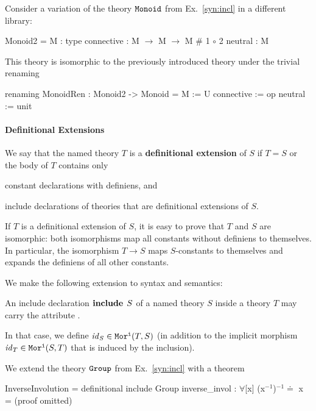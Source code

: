 \begin{example}[Renaming]
Consider a variation of the theory $\operatorname{\mathtt{Monoid}}$ from Ex.~\ref{syn:incl} in a different library:
\begin{mmtcode}
Monoid2 =
  M          : type
  connective : M $\to$ M $\to$ M	 # 1 $\circ$ 2 
  neutral    : M
\end{mmtcode}
This theory is isomorphic to the previously introduced theory  under the trivial renaming
	\begin{mmtcode}
renaming MonoidRen : Monoid2 -> Monoid =
  M          := U
  connective := op 
  neutral    := unit
\end{mmtcode}
\end{example}

\paragraph{Definitional Extensions}
We say that the named theory $T$ is a \textbf{definitional extension} of $S$ if $T=S$ or the body of $T$ contains only
\begin{compactitem}
 \item constant declarations with definiens, and
 \item include declarations of theories that are definitional extensions of $S$.
\end{compactitem}

If $T$ is a definitional extension of $S$, it is easy to prove that $T$ and $S$ are isomorphic: both isomorphisms map all constants without definiens to themselves. In particular, the isomorphism $T\to S$ maps $S$-constants to themselves and expands the definiens of all other constants.

We make the following extension to syntax and semantics:
\begin{compactitem}
  \item An include declaration $\operatorname{\mathbf{include}}{\;S}$ of a named theory $S$ inside a theory $T$ may carry the attribute .
  \item In that case, we define $\mathit{id}_{S}\in\mathtt{Mor^i}(T,S)$ (in addition to the implicit morphism $\mathit{id}_{T}\in\mathtt{Mor^i}(S,T)$ that is induced by the inclusion).
\end{compactitem}

\begin{example}
We extend the theory $\operatorname{\mathtt{Group}}$ from Ex.~\ref{syn:incl} with a theorem
\begin{mmtcode}
InverseInvolution =
  definitional include Group
  inverse_invol : $\forall$[x] (x$^{-1}$)$^{-1}$$\doteq$ x  =  (proof omitted)
\end{mmtcode}
\end{example}

